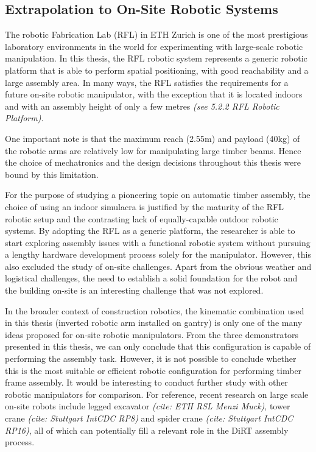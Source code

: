 \subsection{Extrapolation to On-Site Robotic Systems}
\label{subsection:extrapolation_to_on_site_robots}

The robotic Fabrication Lab (RFL) in ETH Zurich is one of the most prestigious laboratory environments in the world for experimenting with large-scale robotic manipulation. In this thesis, the RFL robotic system represents a generic robotic platform that is able to perform spatial positioning, with good reachability and a large assembly area. In many ways, the RFL satisfies the requirements for a future on-site robotic manipulator, with the exception that it is located indoors and with an assembly height of only a few metres \textit{(see 5.2.2 RFL Robotic Platform)}. 

One important note is that the maximum reach (2.55m) and payload (40kg) of the robotic arms are relatively low for manipulating large timber beams. Hence the choice of mechatronics and the design decisions throughout this thesis were bound by this limitation. 

For the purpose of studying a pioneering topic on automatic timber assembly, the choice of using an indoor simulacra is justified by the maturity of the RFL robotic setup and the contrasting lack of equally-capable outdoor robotic systems. By adopting the RFL as a generic platform, the researcher is able to start exploring assembly issues with a functional robotic system without pursuing a lengthy hardware development process solely for the manipulator. However, this also excluded the study of on-site challenges. Apart from the obvious weather and logistical challenges, the need to establish a solid foundation for the robot and the building on-site is an interesting challenge that was not explored. 

In the broader context of construction robotics, the kinematic combination used in this thesis (inverted robotic arm installed on gantry) is only one of the many ideas proposed for on-site robotic manipulators. From the three demonstrators presented in this thesis, we can only conclude that this configuration is capable of performing the assembly task. However, it is not possible to conclude whether this is the most suitable or efficient robotic configuration for performing timber frame assembly. It would be interesting to conduct further study with other robotic manipulators for comparison. For reference, recent research on large scale on-site robots include legged excavator \textit{(cite: ETH RSL Menzi Muck)}, tower crane\textit{ (cite: Stuttgart IntCDC RP8)} and spider crane\textit{ (cite: Stuttgart IntCDC RP16)}, all of which can potentially fill a relevant role in the DiRT assembly process.

